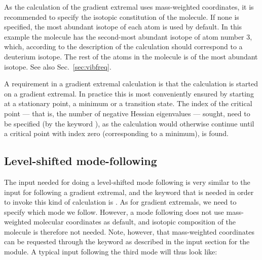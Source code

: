 As the calculation of the gradient extremal uses mass-weighted
coordinates, it is recommended to
specify the isotopic constitution of 
the molecule. If none is specified, the most abundant
isotope of each atom is used by default. In this example the
molecule has the second-most abundant isotope of atom number 3, which,
according to the description of the calculation should correspond 
to a deuterium isotope. The rest of the atoms in the molecule is of
the most abundant isotope. See also Sec.~\ref{sec:vibfreq}.

A requirement in a gradient extremal calculation is that the
calculation is started on a gradient extremal. In practice this is
most conveniently ensured by starting at a stationary point, a minimum
or a transition state. The index of the critical point
--- that is, 
the number of negative Hessian eigenvalues
--- sought, need to 
be specified (by the keyword ), as the calculation would
otherwise continue until a critical point with index zero
(corresponding to a minimum), is found.

\subsection{Level-shifted mode-following}\label{sec:modfol}

\begin{center}
\end{center}

The input needed for doing a level-shifted mode following is very 
similar to the input for following a gradient extremal, and the 
keyword that is needed in order to invoke this kind of calculation is
. As for gradient extremals, we need to specify which
mode we follow. However, a mode following does not use mass-weighted
molecular coordinates as default, and
isotopic composition of the 
molecule is therefore not needed. Note, however, that mass-weighted
coordinates can be requested through the keyword  as
described in the input section for the  module. A typical
input following the third mode will thus look like:

